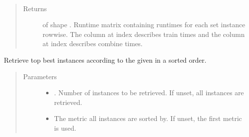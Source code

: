 \documentclass[letterpaper,10pt,english]{sphinxmanual}
\begin{document}
\begin{fulllineitems}
\begin{fulllineitems}
\label{\detokenize{pusion.evaluation.evaluation:pusion.evaluation.evaluation.Evaluation.get_runtime_matrix}}~\begin{quote}\begin{description}
\item[{Returns}] \leavevmode
\sphinxAtStartPar
{} of shape . Runtime matrix containing runtimes
for each set instance row\sphinxhyphen{}wise. The column at index  describes train times and the column at index
 describes combine times.

\end{description}\end{quote}

\end{fulllineitems}


\begin{fulllineitems}
\label{\detokenize{pusion.evaluation.evaluation:pusion.evaluation.evaluation.Evaluation.get_top_n_instances}}
\sphinxAtStartPar
Retrieve top  best instances according to the given  in a sorted order.
\begin{quote}\begin{description}
\item[{Parameters}] \leavevmode\begin{itemize}
\item {} 
\sphinxAtStartPar
{} \textendash{} . Number of instances to be retrieved. If unset, all instances are retrieved.

\item {} 
\sphinxAtStartPar
{} \textendash{} The metric all instances are sorted by. If unset, the first metric is used.

\end{itemize}


\end{description}
\end{quote}
\end{fulllineitems}
\end{fulllineitems}
\end{document}
